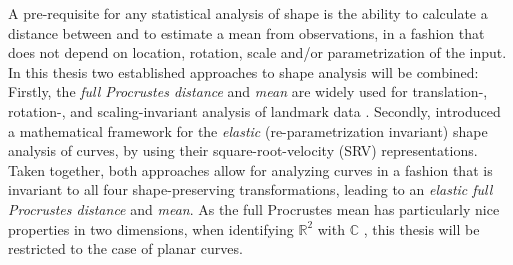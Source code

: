 A pre-requisite for any statistical analysis of shape is the ability to calculate a distance between and to estimate a mean from observations, in a fashion that does not depend on location, rotation, scale and/or parametrization of the input.
In this thesis two established approaches to shape analysis will be combined:
Firstly, the \emph{full Procrustes distance} and \emph{mean} are widely used for translation-, rotation-, and scaling-invariant analysis of landmark data \parencite[see e.g.][Chap.\ 4,\ 6]{DrydenMardia2016}.
Secondly, \cite{SrivastavaEtAl2011} introduced a mathematical framework for the \emph{elastic} (re-parametrization invariant) shape analysis of curves, by using their square-root-velocity (SRV) representations.
Taken together, both approaches allow for analyzing curves in a fashion that is invariant to all four shape-preserving transformations, leading to an \emph{elastic full Procrustes distance} and \emph{mean}.
As the full Procrustes mean has particularly nice properties in two dimensions, when identifying $\mathbb{R}^2$ with $\mathbb{C}$ \parencite[see][Chap.\ 8]{DrydenMardia2016}, this thesis will be restricted to the case of planar curves.

